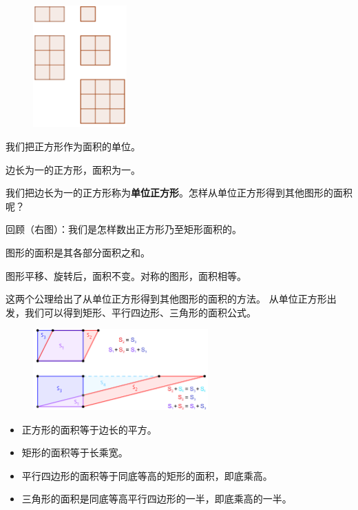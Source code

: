 \documentclass[12pt,UTF8]{ctexbook}
\begin{document}
\begin{figure} 
    \vspace{-30pt}
    \flushright
    \includegraphics[width=0.32\textwidth]{tu/面积_矩形1.png}
\end{figure}

我们把正方形作为面积的单位。
\begin{po}
    边长为一的正方形，面积为一。
\end{po}

我们把边长为一的正方形称为\textbf{单位正方形}。怎样从单位正方形得到其他图形的面积呢？

回顾（右图）：我们是怎样数出正方形乃至矩形面积的。

\begin{po}
    图形的面积是其各部分面积之和。
\end{po}

\begin{po}
    图形平移、旋转后，面积不变。对称的图形，面积相等。
\end{po}
这两个公理给出了从单位正方形得到其他图形的面积的方法。
从单位正方形出发，我们可以得到矩形、平行四边形、三角形的面积公式。

\begin{figure}[H] %
    \vspace{4pt}
    \centering
    \includegraphics[width=0.6\textwidth]{tu/面积_平行四边形1.png}
\end{figure}

\begin{itemize}
    \item 正方形的面积等于边长的平方。
    \item 矩形的面积等于长乘宽。
    \item 平行四边形的面积等于同底等高的矩形的面积，即底乘高。
    \item 三角形的面积是同底等高平行四边形的一半，即底乘高的一半。
\end{itemize}
\end{document}

